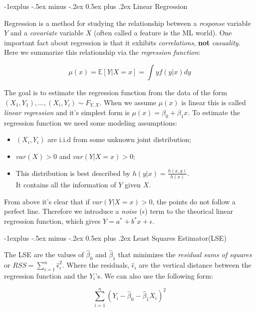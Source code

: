 \documentclass[landscape]{article}
\makeatletter
\renewcommand{\subsection}{\@startsection{subsection}{2}{0mm}%
                                {-1explus -.5ex minus -.2ex}%
                                {0.5ex plus .2ex}%
                                {\normalfont\normalsize\bfseries}}
\makeatother
\begin{document}
\begin{multicols}{3}
\subsection{Linear Regression}

Regression is a method for studying the relationship between a \emph{response} variable $Y$ and a \emph{covariate} variable $X$ (often called a feature is the ML world).
One important fact about regression is that it exhibits \emph{correlations}, \textbf{not} \emph{casuality}. 
Here we summarize this relationship via the \emph{regression function}:

$$\mu(x) = \mathbb{E}[Y | X = x] = \int y f(y|x) dy$$

The goal is to estimate the regression function from the data of the form $(X_1, Y_1), \dots, (X_i, Y_i) \sim F_{Y,X}$. 
When we assume $\mu(x)$ is linear this is called \emph{linear regression} and it's simplest form is $\mu(x) = \beta_0 + \beta_1 x$.
To estimate the regression function we need some modeling assumptions:

\begin{itemize}[itemsep=0em]
    \item $(X_i, Y_i)$ are i.i.d from some unknown joint distribution;
    \item $var(X) > 0$ and $var(Y | X = x) > 0$;
    \item This distribution is best described by $h(y|x) = \frac{h(x, y)}{h(x)}$.\\
          It contains all the information of $Y$ given $X$.
\end{itemize}

From above it's clear that if $var(Y | X = x) > 0$, the points do not follow a perfect line. Therefore we introduce a \emph{noise} ($\epsilon$) term to the 
theorical linear regression function, which gives $Y = a^* + b^* x + \epsilon$. 

\subsection{Least Squares Estimator(LSE)}

The LSE are the values of $\widehat{\beta}_0$ and $\widehat{\beta}_1$ that minimizes the \emph{residual sums of squares} or 
$RSS = \sum_{i = 1}^{n} \widehat{\epsilon}_i^2$.
Where the residuals, $\widehat{\epsilon}_i$ are the vertical distance between the regression function and the $Y_i$'s. We can also use the following form:

$$\sum_{i = 1}^{n} (Y_i - \widehat{\beta}_0 - \widehat{\beta}_1 X_i)^2$$


\end{multicols}
\end{document}

